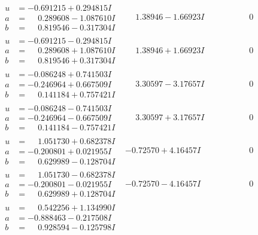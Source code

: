 \documentclass[1p]{elsarticle_modified}
\theoremstyle{definition}
\begin{document}
$$\begin{array}{c|c|c}
\begin{aligned}
u &= -0.691215 + 0.294815 I \\
a &= \phantom{-}0.289608 - 1.087610 I \\
b &= \phantom{-}0.819546 - 0.317304 I\end{aligned}
 & \phantom{-}1.38946 - 1.66923 I & \phantom{-0.000000 } 0 \\ \hline\begin{aligned}
u &= -0.691215 - 0.294815 I \\
a &= \phantom{-}0.289608 + 1.087610 I \\
b &= \phantom{-}0.819546 + 0.317304 I\end{aligned}
 & \phantom{-}1.38946 + 1.66923 I & \phantom{-0.000000 } 0 \\ \hline\begin{aligned}
u &= -0.086248 + 0.741503 I \\
a &= -0.246964 + 0.667509 I \\
b &= \phantom{-}0.141184 + 0.757421 I\end{aligned}
 & \phantom{-}3.30597 - 3.17657 I & \phantom{-0.000000 } 0 \\ \hline\begin{aligned}
u &= -0.086248 - 0.741503 I \\
a &= -0.246964 - 0.667509 I \\
b &= \phantom{-}0.141184 - 0.757421 I\end{aligned}
 & \phantom{-}3.30597 + 3.17657 I & \phantom{-0.000000 } 0 \\ \hline\begin{aligned}
u &= \phantom{-}1.051730 + 0.682378 I \\
a &= -0.200801 + 0.021955 I \\
b &= \phantom{-}0.629989 - 0.128704 I\end{aligned}
 & -0.72570 + 4.16457 I & \phantom{-0.000000 } 0 \\ \hline\begin{aligned}
u &= \phantom{-}1.051730 - 0.682378 I \\
a &= -0.200801 - 0.021955 I \\
b &= \phantom{-}0.629989 + 0.128704 I\end{aligned}
 & -0.72570 - 4.16457 I & \phantom{-0.000000 } 0 \\ \hline\begin{aligned}
u &= \phantom{-}0.542256 + 1.134990 I \\
a &= -0.888463 - 0.217508 I \\
b &= \phantom{-}0.928594 - 0.125798 I\end{aligned}

\end{array}$$
\end{document}
